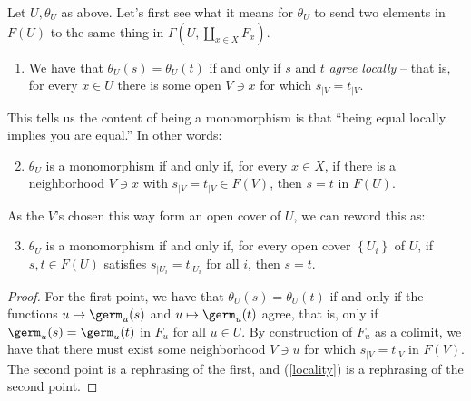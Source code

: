 \documentclass[11pt]{book}
\begin{document}
\begin{lemma}
\label{lem:theta-monomorphism} 
Let $U,\theta_U$ as above. Let's first see what it means for $\theta_U$ to send two elements in $F(U)$ to the same thing in $\Gamma(U,\amalg_{x\in X}F_x)$.
\begin{enumerate}
    \item We have that $\theta_U(s) = \theta_U(t)$ if and only if $s$ and $t$ \emph{agree locally} -- that is, for every $x\in U$ there is some open $V\ni x$ for which $s_{|V} = t_{|V}$.
\end{enumerate}
This tells us the content of being a monomorphism is that ``being equal locally implies you are equal.'' In other words:
\begin{enumerate}
\setcounter{enumi}{1}
    \item $\theta_U$ is a monomorphism if and only if, for every $x\in X$, if there is a neighborhood $V\ni x$ with $s_{|V} = t_{|V}\in F(V)$, then $s=t$ in $F(U)$.
\end{enumerate}
As the $V$'s chosen this way form an open cover of $U$, we can reword this as:
\begin{enumerate}
\setcounter{enumi}{2}
    \item\label{locality} $\theta_U$ is a monomorphism if and only if, for every open cover $\left\{ U_i \right\}$ of $U$, if $s,t\in F(U)$ satisfies $s_{|U_i} = t_{|U_i}$ for all $i$, then $s=t$.
\end{enumerate}
\end{lemma}
\begin{proof} For the first point, we have that $\theta_U(s) = \theta_U(t)$ if and only if the functions $u \mapsto \germ_u(s)$ and $u \mapsto \germ_u(t)$ agree, that is, only if $\germ_u(s) = \germ_u(t)$ in $F_u$ for all $u\in U$. By construction of $F_u$ as a colimit, we have that there must exist some neighborhood $V\ni u$ for which $s_{|V} = t_{|V}$ in $F(V)$. The second point is a rephrasing of the first, and (\ref{locality}) is a rephrasing of the second point.
\end{proof}
\end{document}
